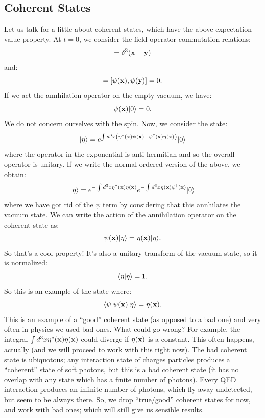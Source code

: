\subsection{Coherent States}
Let us talk for a little about coherent states, which have the above expectation value property. At $t = 0$, we consider the field-operator commutation relations:
\begin{equation}
    [\psi(\v{x}), \psi^{\dag}(\v{y})] = \delta^{3}(\v{x} - \v{y})
\end{equation}
and:
\begin{equation}
    [\psi^\dag(\v{x}), \psi^{\dag}(\v{y})] =  [\psi(\v{x}), \psi(\v{y})] = 0.
\end{equation}
If we act the annhilation operator on the empty vacuum, we have:
\begin{equation}
    \psi(\mathbf{x})\lvert 0 \rangle = 0.
\end{equation}
We do not concern ourselves with the spin. Now, we consider the state:
\begin{equation}
    \lvert \eta \rangle = e^{\int d^3x\left(\eta^*(\mathbf{x})\psi(\mathbf{x}) - \psi^\dagger(\mathbf{x})\eta(\mathbf{x})\right)}\lvert 0 \rangle
\end{equation}
where the operator in the exponential is anti-hermitian and so the overall operator is unitary. If we write the normal ordered version of the above, we obtain:
\begin{equation}
    \lvert \eta \rangle = e^{-\int d^3x \eta^*(\mathbf{x})\eta(\mathbf{x})}e^{-\int d^3x \eta(\mathbf{x})\psi^\dagger(\mathbf{x})}\lvert 0 \rangle
\end{equation}
where we have got rid of the $\psi$ term by considering that this annhilates the vacuum state. We can write the action of the annihilation operator on the coherent state as:
\begin{equation}
    \psi(\mathbf{x})\lvert \eta \rangle = \eta(\mathbf{x})\lvert \eta \rangle.
\end{equation}
So that's a cool property! It's also a unitary transform of the vacuum state, so it is normalized:
\begin{equation}
    \langle \eta \lvert \eta \rangle = 1.
\end{equation}
So this is an example of the state where:
\begin{equation}
    \langle \psi \rvert\psi(\mathbf{x})\lvert \eta \rangle = \eta(\mathbf{x}).
\end{equation}
This is an example of a ``good'' coherent state (as opposed to a bad one) and very often in physics we used bad ones. What could go wrong? For example, the integral $\int d^3x \eta^*(\mathbf{x})\eta(\mathbf{x})$ could diverge if $\eta(\mathbf{x})$ is a constant. This often happens, actually (and we will proceed to work with this right now). The bad coherent state is ubiquotous; any interaction state of charges particles produces a ``coherent'' state of soft photons, but this is a bad coherent state (it has no overlap with any state which has a finite number of photons). Every QED interaction produces an infinite number of photons, which fly away undetected, but seem to be always there. So, we drop ``true/good'' coherent states for now, and work with bad ones; which will still give us sensible results.

